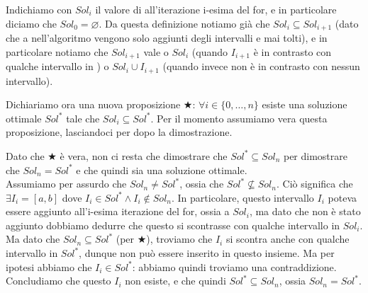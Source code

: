 \documentclass[11pt, a4paper, titlepage, oneside]{scrbook}
\begin{document}
\Dimostrazione \nopagebreak

Indichiamo con $Sol_i$ il valore di  all'iterazione i-esima del for, e in particolare diciamo che $Sol_0 = \varnothing$. Da questa definizione notiamo già che $Sol_i \subseteq Sol_{i+1}$ (dato che a  nell'algoritmo vengono solo aggiunti degli intervalli e mai tolti), e in particolare notiamo che $Sol_{i+1}$ vale o $Sol_i$ (quando $I_{i+1}$ è in contrasto con qualche intervallo in ) o $Sol_{i} \cup I_{i+1}$ (quando invece non è in contrasto con nessun intervallo).

Dichiariamo ora una nuova proposizione $\bigstar$: $\forall i \in \{0, \ldots, n\}$ esiste una soluzione ottimale $Sol^*$ tale che $Sol_i \subseteq Sol^*$. Per il momento assumiamo vera questa proposizione, lasciandoci per dopo la dimostrazione.

Dato che $\bigstar$ è vera, non ci resta che dimostrare che $Sol^* \subseteq Sol_n$ per dimostrare che $Sol_n = Sol^*$ e che quindi  sia una soluzione ottimale. \\
Assumiamo per assurdo che $Sol_n \neq Sol^*$, ossia che $Sol^* \nsubseteq Sol_n$. Ciò significa che $\exists I_i = [a,b]$ dove $I_i \in Sol^* \land I_i \notin Sol_n$. In particolare, questo intervallo $I_i$ poteva essere aggiunto all'i-esima iterazione del for, ossia a $Sol_i$, ma dato che non è stato aggiunto dobbiamo dedurre che questo si scontrasse con qualche intervallo in $Sol_i$. Ma dato che $Sol_n \subseteq Sol^*$ (per $\bigstar$), troviamo che $I_i$ si scontra anche con qualche intervallo in $Sol^*$, dunque non può essere inserito in questo insieme. Ma per ipotesi abbiamo che $I_i \in Sol^*$: abbiamo quindi troviamo una contraddizione. Concludiamo che questo $I_i$ non esiste, e che quindi $Sol^* \subseteq Sol_n$, ossia $Sol_n = Sol^*$.
\end{document}
